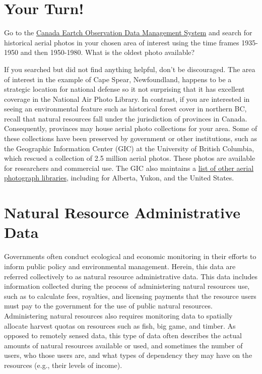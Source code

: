 \documentclass[
]{book}
\begin{document}
\hypertarget{your-turn-5}{%
\section*{Your Turn!}\label{your-turn-5}}

Go to the \href{https://www.eodms-sgdot.nrcan-rncan.gc.ca/index-en.html}{Canada Eartch Observation Data Management System} and search for historical aerial photos in your chosen area of interest using the time frames 1935-1950 and then 1950-1980. What is the oldest photo available?

If you searched but did not find anything helpful, don't be discouraged. The area of interest in the example of Cape Spear, Newfoundland, happens to be a strategic location for national defense so it not surprising that it has excellent coverage in the National Air Photo Library. In contrast, if you are interested in seeing an environmental feature such as historical forest cover in northern BC, recall that natural resources fall under the jurisdiction of provinces in Canada. Consequently, provinces may house aerial photo collections for your area. Some of these collections have been preserved by government or other institutions, such as the Geographic Information Center (GIC) at the University of British Columbia, which rescued a collection of 2.5 million aerial photos. These photos are available for researchers and commercial use. The GIC also maintains a \href{https://gic.geog.ubc.ca/resources/air-photo-collection-and-services/other-sources-of-air-photo-information/}{list of other aerial photograph libraries}, including for Alberta, Yukon, and the United States.

\hypertarget{natural-resource-administrative-data}{%
\section{Natural Resource Administrative Data}\label{natural-resource-administrative-data}}

Governments often conduct ecological and economic monitoring in their efforts to inform public policy and environmental management. Herein, this data are referred collectively to as natural resource administrative data. This data includes information collected during the process of administering natural resources use, such as to calculate fees, royalties, and licensing payments that the resource users must pay to the government for the use of public natural resources. Administering natural resources also requires monitoring data to spatially allocate harvest quotas on resources such as fish, big game, and timber. As opposed to remotely sensed data, this type of data often describes the actual amounts of natural resources available or used, and sometimes the number of users, who those users are, and what types of dependency they may have on the resources (e.g., their levels of income).
\end{document}
